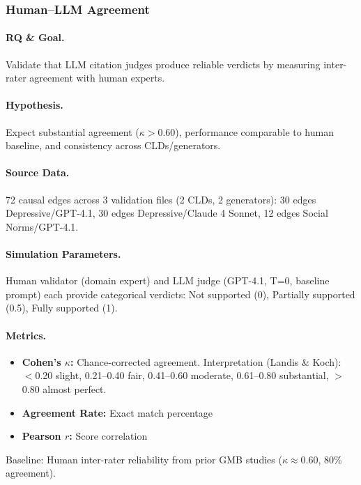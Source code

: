\subsubsection{Human--LLM Agreement}
\label{sec:human_llm_agreement}

\paragraph{RQ \& Goal.}
Validate that LLM citation judges produce reliable verdicts by measuring inter-rater agreement with human experts.

\paragraph{Hypothesis.}
Expect substantial agreement ($\kappa > 0.60$), performance comparable to human baseline, and consistency across CLDs/generators.

\paragraph{Source Data.}
72 causal edges across 3 validation files (2 CLDs, 2 generators): 30 edges Depressive/GPT-4.1, 30 edges Depressive/Claude 4 Sonnet, 12 edges Social Norms/GPT-4.1.

\paragraph{Simulation Parameters.}
Human validator (domain expert) and LLM judge (GPT-4.1, T=0, baseline prompt) each provide categorical verdicts: Not supported (0), Partially supported (0.5), Fully supported (1).

\paragraph{Metrics.}
\begin{itemize}[noitemsep]
    \item \textbf{Cohen's $\kappa$:} Chance-corrected agreement. Interpretation (Landis \& Koch): $<$0.20 slight, 0.21--0.40 fair, 0.41--0.60 moderate, 0.61--0.80 substantial, $>$0.80 almost perfect.
    \item \textbf{Agreement Rate:} Exact match percentage
    \item \textbf{Pearson $r$:} Score correlation
\end{itemize}
Baseline: Human inter-rater reliability from prior GMB studies ($\kappa \approx 0.60$, 80\% agreement).

